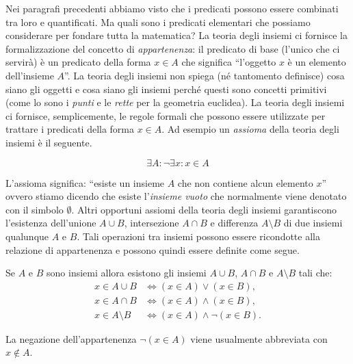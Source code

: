 Nei paragrafi precedenti abbiamo visto che i predicati possono essere
combinati tra loro e quantificati.
Ma quali sono i predicati elementari che possiamo considerare per fondare 
tutta la matematica?
La teoria degli insiemi ci fornisce la formalizzazione del concetto
di \emph{appartenenza}: il predicato di base (l'unico che ci servirà) è
un predicato della forma $x \in A$ che significa ``l'oggetto $x$ è un elemento
dell'insieme $A$''.
La teoria degli insiemi non spiega (né tantomento definisce)
cosa siano gli oggetti e cosa siano gli insiemi perché questi sono concetti
primitivi (come lo sono i \emph{punti} e le \emph{rette} per la geometria euclidea).
La teoria degli insiemi ci fornisce, semplicemente, le regole formali che
possono essere utilizzate per trattare i predicati della forma $x\in A$.
Ad esempio un \emph{assioma} 
della teoria degli insiemi è il seguente.
\begin{axiom}
\[
  \exists A \colon \lnot \exists x\colon x \in A
\]
\end{axiom}
L'assioma significa: ``esiste un insieme $A$ che non contiene alcun elemento $x$''
ovvero stiamo dicendo che esiste l'\emph{insieme vuoto}%
%
 che normalmente viene
denotato con il simbolo $\emptyset$.
Altri opportuni assiomi della teoria degli insiemi garantiscono l'esistenza
dell'unione $A\cup B$, intersezione $A\cap B$ e differenza $A\setminus B$
di due insiemi qualunque $A$ e $B$. Tali operazioni
tra insiemi possono essere ricondotte alla relazione di appartenenza
e possono quindi essere definite come segue.
\begin{axiom}
Se $A$ e $B$ sono insiemi allora esistono gli insiemi  
$A\cup B$, $A\cap B$ e $A\setminus B$ tali che:
\begin{align*}
    x \in A \cup B &\iff (x\in A) \lor (x\in B),\\
    x \in A \cap B &\iff (x\in A) \land (x\in B),\\
    x \in A \setminus B &\iff (x\in A) \land \lnot (x \in B).
\end{align*}
\end{axiom}

La negazione dell'appartenenza $\lnot (x \in A)$ viene usualmente
abbreviata con $x \not \in A$.

